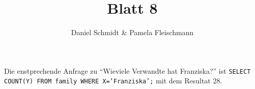 \documentclass[12pt,a4paper]{amsart}
\begin{document}
\title{Blatt 8}

\author{Daniel Schmidt \& Pamela Fleischmann}

\maketitle

\begin{aufgabe1}


Die enstprechende Anfrage zu ``Wieviele Verwandte hat Franziska?'' ist \texttt{SELECT COUNT(Y) FROM family WHERE X='Franziska';} mit dem Resultat 28.
\end{aufgabe1}


\begin{aufgabe1}
\end{aufgabe1}

\begin{aufgabe1}
\end{aufgabe1}
\end{document}
